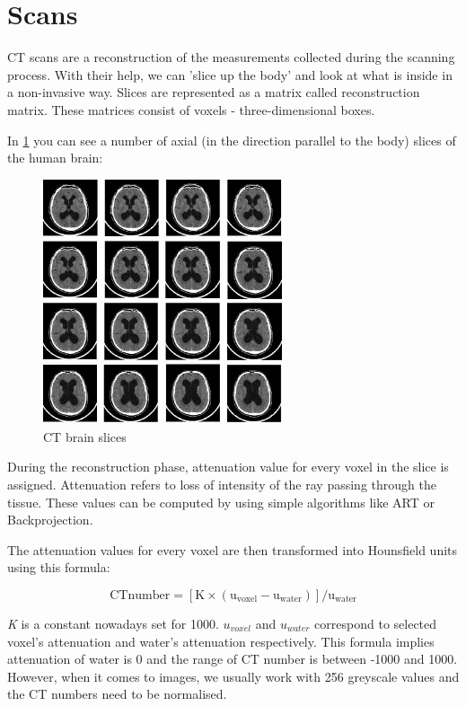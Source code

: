 \section{Scans}

CT scans are a reconstruction of the measurements collected during the scanning process. With their help, we can 'slice up the body' and look at what is inside in a non-invasive way. Slices are represented as a matrix called reconstruction matrix. These matrices consist of voxels - three-dimensional boxes. 

In \ref{fig:ct-brain-slices} you can see a number of axial (in the direction parallel to the body) slices of the human brain: 

\begin{figure}[ht]
    \centering
    \includegraphics[width=200pt]{images/ct-brain-slices.jpg}
    \caption[CT brain slices]{CT brain slices \cite{brain-image}}
    \label{fig:ct-brain-slices}
\end{figure}

During the reconstruction phase, attenuation value for every voxel in the slice is assigned. Attenuation refers to loss of intensity of the ray passing through the tissue. These values can be computed by using simple algorithms like ART or Backprojection.

The attenuation values for every voxel are then transformed into Hounsfield units using this formula:

\begin{equation}
    \mathrm{CT number = [K \times (u_{voxel}-u_{water})]/u_{water}}
\end{equation}

\textit{K} is a constant nowadays set for 1000. \textit{$u_{voxel}$} and \textit{$u_{water}$} correspond to selected voxel's attenuation and water's attenuation respectively. This formula implies attenuation of water is 0 and the range of CT number is between -1000 and 1000. However, when it comes to images, we usually work with 256 greyscale values and the CT numbers need to be normalised. \cite{goldman2007}

